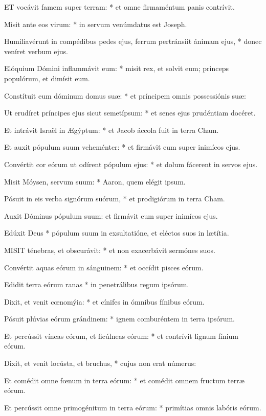 
\lettrine[lines=2]{E}{T} vocávit famem super terram: * et omne firmaméntum panis contrívit.

Misit ante eos virum: * in servum venúmdatus est Joseph.

Humiliavérunt in compédibus pedes ejus, ferrum pertránsiit ánimam ejus, * donec veníret verbum ejus.

Elóquium Dómini inflammávit eum: * misit rex, et solvit eum; princeps populórum, et dimísit eum.

Constítuit eum dóminum domus suæ: * et príncipem omnis possessiónis suæ:

Ut erudíret príncipes ejus sicut semetípsum: * et senes ejus prudéntiam docéret.

Et intrávit Israël in Ægýptum: * et Jacob áccola fuit in terra Cham.

Et auxit pópulum suum veheménter: * et firmávit eum super inimícos ejus.

Convértit cor eórum ut odírent pópulum ejus: * et dolum fácerent in servos ejus.

Misit Móysen, servum suum: * Aaron, quem elégit ipsum.

Pósuit in eis verba signórum suórum, * et prodigiórum in terra Cham.

 Auxit Dóminus pópulum suum: et firmávit eum super inimícos ejus.

 Edúxit Deus * pópulum suum in exsultatióne, et eléctos suos in lætítia.


\lettrine[lines=2]{M}{ISIT} ténebras, et obscurávit: * et non exacerbávit sermónes suos.

Convértit aquas eórum in sánguinem: * et occídit pisces eórum.

Edidit terra eórum ranas * in penetrálibus regum ipsórum.

Dixit, et venit cœnomýia: * et cínifes in ómnibus fínibus eórum.

Pósuit plúvias eórum grándinem: * ignem comburéntem in terra ipsórum.

Et percússit víneas eórum, et ficúlneas eórum: * et contrívit lignum fínium eórum.

Dixit, et venit locústa, et bruchus, * cujus non erat númerus:

Et comédit omne fœnum in terra eórum: * et comédit omnem fructum terræ eórum.

Et percússit omne primogénitum in terra eórum: * primítias omnis labóris eórum.

